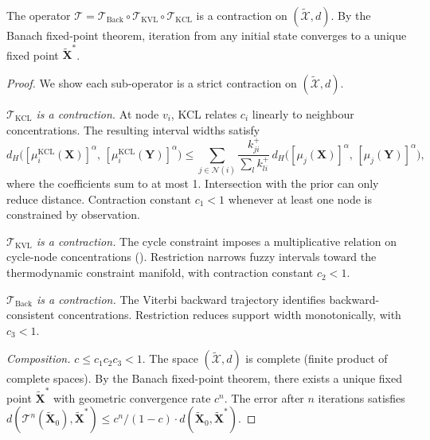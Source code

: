 \begin{theorem}
\label{thm:convergence}
The operator
$\mathcal{T} = \mathcal{T}_{\mathrm{Back}} \circ \mathcal{T}_{\mathrm{KVL}} \circ \mathcal{T}_{\mathrm{KCL}}$
is a contraction on $(\widetilde{\mathcal{X}}, d)$.  By the Banach
fixed-point theorem, iteration from any initial state converges to a unique
fixed point $\widetilde{\mathbf{X}}^{*}$.
\end{theorem}

\begin{proof}
We show each sub-operator is a strict contraction on
$(\widetilde{\mathcal{X}}, d)$.

\emph{$\mathcal{T}_{\mathrm{KCL}}$ is a contraction.}
At node $v_i$, KCL relates $c_i$ linearly to neighbour concentrations.
The resulting interval widths satisfy
\begin{equation}
  d_H\bigl([\mu_i^{\mathrm{KCL}}(\mathbf{X})]^{\alpha},\,
           [\mu_i^{\mathrm{KCL}}(\mathbf{Y})]^{\alpha}\bigr)
  \leq \sum_{j \in \mathcal{N}(i)}
    \frac{k_{ji}^{+}}{\sum_l k_{li}^{+}}\,
    d_H\bigl([\mu_j(\mathbf{X})]^{\alpha},\, [\mu_j(\mathbf{Y})]^{\alpha}\bigr),
\end{equation}
where the coefficients sum to at most 1.  Intersection with the prior can
only reduce distance.  Contraction constant $c_1 < 1$ whenever at least
one node is constrained by observation.

\emph{$\mathcal{T}_{\mathrm{KVL}}$ is a contraction.}
The cycle constraint imposes a multiplicative relation on cycle-node
concentrations ().  Restriction narrows fuzzy
intervals toward the thermodynamic constraint manifold, with contraction
constant $c_2 < 1$.

\emph{$\mathcal{T}_{\mathrm{Back}}$ is a contraction.}
The Viterbi backward trajectory identifies backward-consistent
concentrations.  Restriction reduces support width monotonically, with
$c_3 < 1$.

\emph{Composition.}
$c \leq c_1 c_2 c_3 < 1$.  The space $(\widetilde{\mathcal{X}}, d)$ is
complete (finite product of complete spaces).  By the Banach fixed-point
theorem, there exists a unique fixed point $\widetilde{\mathbf{X}}^{*}$
with geometric convergence rate $c^n$.  The error after $n$ iterations
satisfies
$d(\mathcal{T}^n(\widetilde{\mathbf{X}}_0), \widetilde{\mathbf{X}}^{*})
\leq c^n/(1-c) \cdot d(\widetilde{\mathbf{X}}_0, \widetilde{\mathbf{X}}^{*})$.
\end{proof}


